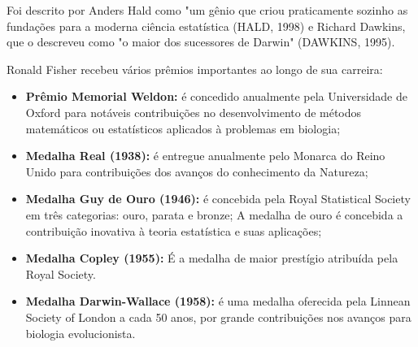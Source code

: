 Foi descrito por Anders Hald como "um gênio que criou praticamente sozinho as fundações para a moderna ciência estatística (HALD, 1998) e Richard Dawkins, que o descreveu como "o maior dos sucessores de Darwin" (DAWKINS, 1995).\vskip0.3cm


\newpage
Ronald Fisher recebeu vários prêmios importantes ao longo de sua carreira:

\begin{itemize}
    \item \textbf{Prêmio Memorial Weldon:} é concedido anualmente pela Universidade de Oxford para notáveis contribuições no desenvolvimento de métodos matemáticos ou estatísticos aplicados à problemas em biologia; 
    \item \textbf{Medalha Real (1938):} é entregue anualmente pelo Monarca do Reino Unido para contribuições dos avanços do conhecimento da Natureza;
    \item \textbf{Medalha Guy de Ouro (1946):} é concebida pela Royal Statistical Society em três categorias: ouro, parata e bronze; A medalha de ouro é concebida a contribuição inovativa à teoria estatística e suas aplicações;
    \item \textbf{Medalha Copley (1955):} É a medalha de maior prestígio atribuída pela Royal Society.
    \item \textbf{Medalha Darwin-Wallace (1958):} é uma medalha oferecida pela Linnean Society of London a cada 50 anos, por grande contribuições nos avanços para biologia evolucionista.
\end{itemize}


